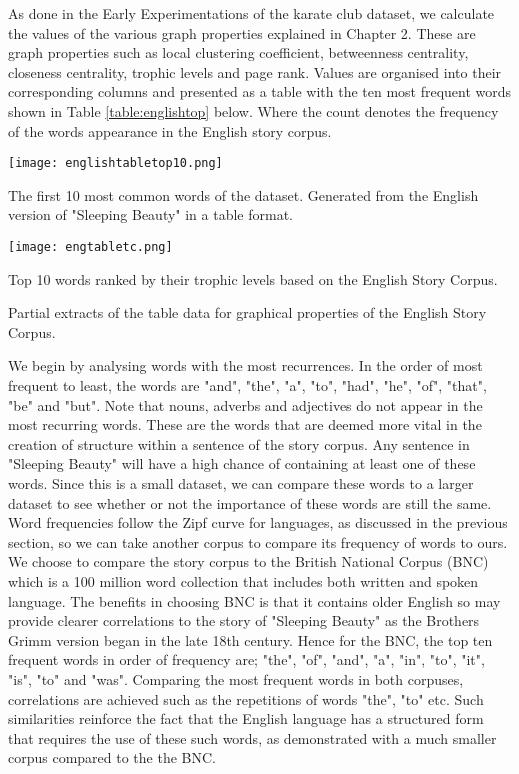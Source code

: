 As done in the Early Experimentations of the karate club dataset, we calculate the values of the various graph properties explained in Chapter 2. These are graph properties such as local clustering coefficient, betweenness centrality, closeness centrality, trophic levels and page rank. Values are organised into their corresponding columns and presented as a table with the ten most frequent words shown in Table \ref{table:englishtop} below. Where the count denotes the frequency of the words appearance in the English story corpus. 

\begin{table}[H]
\centering
\begin{subtable}{.45\textwidth}
	\texttt{[image: englishtabletop10.png]}
	\caption{The first 10 most common words of the dataset. Generated from the English version of "Sleeping Beauty" in a table format. }
	\label{table:englishtop}
\end{subtable}
\hfill
\begin{subtable}{.45\textwidth}
	\hspace{1.5cm} 
	\texttt{[image: engtabletc.png]}
	\caption{Top 10 words ranked by their trophic levels based on the English Story Corpus.}
	\label{table:englishtoptc}
\end{subtable}
\caption{Partial extracts of the table data for graphical properties of the English Story Corpus.}
\end{table}

We begin by analysing words with the most recurrences. In the order of most frequent to least, the words are "and", "the", "a", "to", "had", "he", "of", "that", "be" and "but". Note that nouns, adverbs and adjectives do not appear in the most recurring words. These are the words that are deemed more vital in the creation of structure within a sentence of the story corpus. Any sentence in "Sleeping Beauty" will have a high chance of containing at least one of these words. Since this is a small dataset, we can compare these words to a larger dataset to see whether or not the importance of these words are still the same. Word frequencies follow the Zipf curve for languages, as discussed in the previous section, so we can take another corpus to compare its frequency of words to ours. We choose to compare the story corpus to the British National Corpus (BNC) \cite{bnc2007british} which is a 100 million word collection that includes both written and spoken language. The benefits in choosing BNC is that it contains older English so may provide clearer correlations to the story of "Sleeping Beauty" as the Brothers Grimm version began in the late 18th century. Hence for the BNC, the top ten frequent words \cite{leech2014word} in order of frequency are; "the", "of", "and", "a", "in", "to", "it", "is", "to" and "was". Comparing the most frequent words in both corpuses, correlations are achieved such as the repetitions of words "the", "to" etc. Such similarities reinforce the fact that the English language has a structured form that requires the use of these such words, as demonstrated with a much smaller corpus compared to the the BNC.

